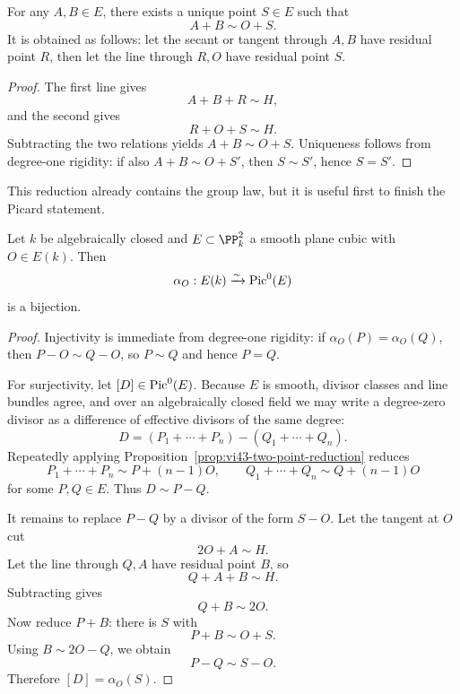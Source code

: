 \begin{proposition}\label{prop:vi43-two-point-reduction}
For any \(A,B\in E\), there exists a unique point \(S\in E\) such that
\[
  A+B\sim O+S.
\]
It is obtained as follows: let the secant or tangent through \(A,B\) have residual point \(R\), then let the line through \(R,O\) have residual point \(S\).
\end{proposition}

\begin{proof}
The first line gives
\[
  A+B+R\sim H,
\]
and the second gives
\[
  R+O+S\sim H.
\]
Subtracting the two relations yields \(A+B\sim O+S\).  Uniqueness follows from degree-one rigidity: if also \(A+B\sim O+S'\), then \(S\sim S'\), hence \(S=S'\).
\end{proof}

This reduction already contains the group law, but it is useful first to finish the Picard statement.

\begin{theorem}\label{thm:vi43-abel-picard-bijection}
Let \(k\) be algebraically closed and \(E\subset\PP^2_k\) a smooth plane cubic with \(O\in E(k)\).  Then
\[
  \alpha_O:E(k)\xrightarrow{\sim}\operatorname{Pic}^0(E)
\]
is a bijection.
\end{theorem}

\begin{proof}
Injectivity is immediate from degree-one rigidity: if \(\alpha_O(P)=\alpha_O(Q)\), then \(P-O\sim Q-O\), so \(P\sim Q\) and hence \(P=Q\).

For surjectivity, let \([D]\in\operatorname{Pic}^0(E)\).  Because \(E\) is smooth, divisor classes and line bundles agree, and over an algebraically closed field we may write a degree-zero divisor as a difference of effective divisors of the same degree:
\[
  D=(P_1+\cdots+P_n)-(Q_1+\cdots+Q_n).
\]
Repeatedly applying Proposition~\ref{prop:vi43-two-point-reduction} reduces
\[
  P_1+\cdots+P_n\sim P+(n-1)O,
  \qquad
  Q_1+\cdots+Q_n\sim Q+(n-1)O
\]
for some \(P,Q\in E\).  Thus \(D\sim P-Q\).

It remains to replace \(P-Q\) by a divisor of the form \(S-O\).  Let the tangent at \(O\) cut
\[
  2O+A\sim H.
\]
Let the line through \(Q,A\) have residual point \(B\), so
\[
  Q+A+B\sim H.
\]
Subtracting gives
\[
  Q+B\sim2O.
\]
Now reduce \(P+B\): there is \(S\) with
\[
  P+B\sim O+S.
\]
Using \(B\sim2O-Q\), we obtain
\[
  P-Q\sim S-O.
\]
Therefore \([D]=\alpha_O(S)\).
\end{proof}

